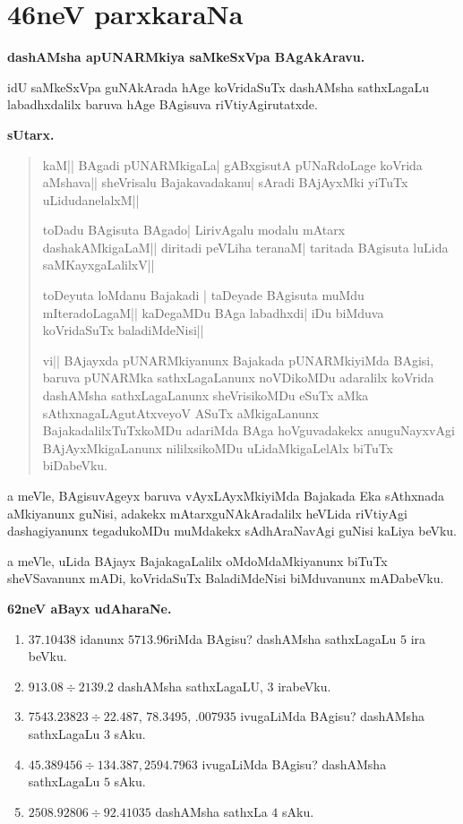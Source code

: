 \chapter{46neV parxkaraNa}

\begin{center}
{\bf dashAMsha apUNARMkiya saMkeSxVpa BAgAkAravu.}
\end{center}   

idU saMkeSxVpa guNAkArada hAge koVridaSuTx dashAMsha sathxLagaLu labadhxdalilx baruva hAge BAgisuva riVtiyAgirutatxde.

\begin{center}
{\bf\large sUtarx.}
\end{center}

\begin{verse}
kaM|| BAgadi pUNARMkigaLa| gABxgisutA pUNaRdoLage koVrida aMshava|| sheVrisalu Bajakavadakanu| sAradi BAjAyxMki yiTuTx uLidudanelalxM||

toDadu BAgisuta BAgado| LirivAgalu modalu mAtarx dashakAMkigaLaM|| diritadi peVLiha teranaM| taritada BAgisuta luLida saMKayxgaLalilxV||

toDeyuta loMdanu Bajakadi | taDeyade BAgisuta muMdu mIteradoLagaM|| kaDegaMDu BAga labadhxdi| iDu biMduva koVridaSuTx baladiMdeNisi||

vi|| BAjayxda pUNARMkiyanunx Bajakada pUNARMkiyiMda BAgisi, baruva pUNARMka sathxLagaLanunx noVDikoMDu adaralilx koVrida dashAMsha sathxLagaLanunx sheVrisikoMDu eSuTx aMka sAthxnagaLAgutAtxveyoV ASuTx aMkigaLanunx BajakadalilxTuTxkoMDu adariMda BAga hoVguvadakekx anuguNayxvAgi BAjAyxMkigaLanunx nililxsikoMDu uLidaMkigaLelAlx biTuTx biDabeVku.
\end{verse}

a meVle, BAgisuvAgeyx baruva vAyxLAyxMkiyiMda Bajakada Eka sAthxnada aMkiyanunx guNisi, adakekx mAtarx\break guNAkAradalilx heVLida riVtiyAgi dashagiyanunx tegadukoMDu muMdakekx sAdhAraNavAgi guNisi kaLiya beVku.

a meVle, uLida BAjayx BajakagaLalilx oMdoMdaMkiyanunx biTuTx sheVSavanunx mADi, koVridaSuTx 
BaladiMdeNisi biMduvanunx mADabeVku.

\begin{center}
{\bf\large 62neV aBayx udAharaNe.}
\end{center}

\begin{enumerate}[\rm (1)]
\item $37.10438$ idanunx $5713.96$riMda BAgisu? dashAMsha sathxLagaLu $5$ ira beVku.

\item $913.08 \div 2139.2$ dashAMsha sathxLagaLU, $3$ irabeVku.

\item $7543.23823 \div 22.487$, $78.3495$, $.007935$ ivugaLiMda BAgisu? dashAMsha sathxLagaLu $3$ sAku.

\item $45.389456 \div 134.387, 2594.7963$ ivugaLiMda BAgisu? dashAMsha sathxLagaLu $5$ sAku.

\item $2508.92806 \div 92.41035$ dashAMsha sathxLa $4$ sAku.
\end{enumerate}

